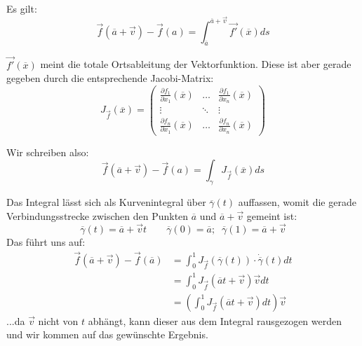 \documentclass[a4paper,german,12pt,smallheadings]{scrartcl}
\begin{document}
Es gilt:
\begin{equation*}
\vec{f}\left(\overline{a}+\vec{v}\right)-\vec{f}(a)=\int_{\overline{a}}^{\overline{a}+\vec{v}}  \vec{f'}(\overline{x})ds
\end{equation*}

$\vec{f'}(\overline{x})$ meint die totale Ortsableitung der Vektorfunktion. Diese ist aber gerade gegeben durch die entsprechende Jacobi-Matrix:
\begin{equation*}
J_{\vec{f}}(\overline{x})=\begin{pmatrix}
\frac{\partial f_1}{\partial x_1}(\overline{x}) & \dots & \frac{\partial f_1}{\partial x_n}(\overline{x})\\ \vdots & \ddots & \vdots\\ \frac{\partial f_n}{\partial x_1}(\overline{x}) &
\dots & \frac{\partial f_n}{\partial x_n}(\overline{x})
\end{pmatrix}
\end{equation*}

Wir schreiben also:
\begin{equation*}
\vec{f}\left(\overline{a}+\vec{v}\right)-\vec{f}(a)=\int_\gamma J_{\vec{f}}(\overline{x})ds
\end{equation*}

Das Integral lässt sich als Kurvenintegral über $\overline{\gamma}(t)$ auffassen, womit die gerade Verbindungsstrecke zwischen den Punkten $\overline{a}$ und $\overline{a}+\vec{v}$ gemeint ist:
\begin{equation*}
\overline{\gamma}(t)=\overline{a}+\vec{v}t \quad \quad \overline{\gamma}(0)=\overline{a}; \;\; \overline{\gamma}(1)=\overline{a}+\vec{v}
\end{equation*}
Das führt uns auf:
\begin{align*}
\vec{f}(\overline{a}+\vec{v})-\vec{f}(\overline{a})&=\int_{0}^{1}J_{\vec{f}}(\overline{\gamma}(t))\cdot \dot{\overline{\gamma}}(t)dt\\
&=\int_{0}^{1}J_{\vec{f}}(\overline{a}t+\vec{v})\vec{v}dt\\
&=\left(\int_{0}^{1}J_{\vec{f}}\left(\overline{a}t+\vec{v}\right)dt\right)\vec{v}
\end{align*}
...da $\vec{v}$ nicht von $t$ abhängt, kann dieser aus dem Integral rausgezogen werden und wir kommen auf das gewünschte Ergebnis.
\end{document}
